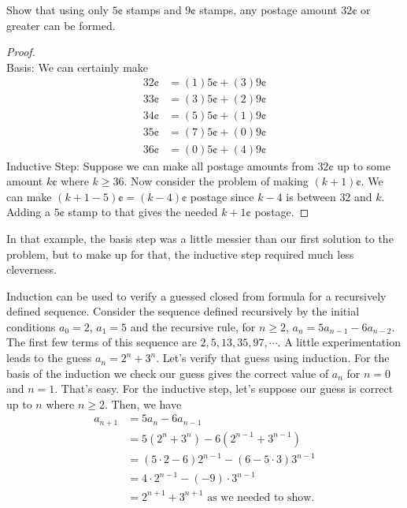 \begin{exmp}
 Show that using only $5\cent$ stamps and  $9\cent$
 stamps,
 any postage amount $32\cent$ or greater can be formed.
 \begin{proof}
 \ \\
  \textsf{Basis:} We can certainly make
   \begin{align*}
     32\cent &= (1)5 \cent+ (3)9\cent \\
     33\cent &= (3)5 \cent+ (2)9\cent \\
     34\cent &= (5)5 \cent+ (1)9\cent \\
     35\cent &= (7)5 \cent+ (0)9\cent \\
     36\cent &= (0)5 \cent+ (4)9\cent 
   \end{align*}  
   \textsf{Inductive Step:} Suppose we can make all postage amounts from $32\cent$
   up to some amount $k\cent$ where $k\geq 36$. Now consider the problem
   of making $(k+1)\cent$. We can make $(k+1-5)\cent= (k-4)\cent$ 
   postage since $k-4$ is between $32$ and $k$. Adding a  $5\cent$ stamp to
   that gives the needed  $k+1\cent$ postage.
 \end{proof}
 
\end{exmp}

In that example, the basis step was a little messier than our first solution to the problem, but
to make up for that, the inductive step required much less cleverness.
 
 
\begin{exmp}
 Induction can be used to verify a guessed closed from formula
 for a recursively defined sequence. Consider the sequence defined recursively by
 the initial conditions $a_0=2$, $a_1=5$ and the recursive rule, for $n\geq 2$, 
 $a_n = 5a_{n-1} - 6a_{n-2}$. The first few terms of this sequence
 are $2,5, 13, 35, 97,\cdots$. A little experimentation leads to the guess
 $a_n = 2^n+3^n$. Let's verify that guess using induction. For the basis of the
 induction we check our guess gives the correct value of $a_n$ for $n=0$ and $n=1$.
 That's easy. For the inductive step, let's suppose our guess is correct up to $n$ where
 $n\geq 2$. Then, we have
 \begin{align*}
   a_{n+1} &= 5a_n-6a_{n-1} \\
           &= 5(2^{n}+3^{n}) -6(2^{n-1}+3^{n-1}) \\
           & = (5\cdot2-6)2^{n-1} - (6-5\cdot3)3^{n-1} \\
           & = 4\cdot2^{n-1} - (-9)\cdot3^{n-1} \\
           & = 2^{n+1}+3^{n+1} \text{  as we needed to show.}
 \end{align*}
\end{exmp} 


